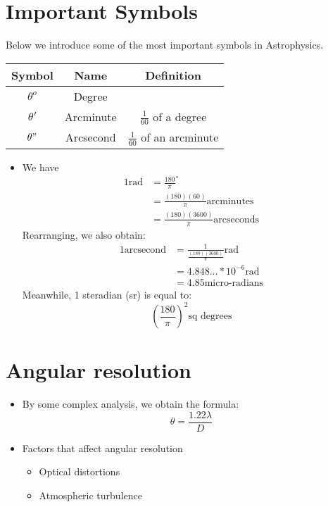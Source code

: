 \documentclass{article}
\begin{document}
\section{Important Symbols}
Below we introduce some of the most important symbols in Astrophysics.
\begin{table}[h]
  \begin{center}
    \begin{tabular}{c|c|c}
      \textbf{Symbol} & \textbf{Name}&\textbf{Definition}\\
      \hline
      $\theta^o$ & Degree &\\
      $\theta'$ & Arcminute & $\frac{1}{60}$ of a degree\\
      $\theta"$ & Arcsecond & $\frac{1}{60}$ of an arcminute
      \end{tabular}
  \end{center}
\end{table}
\begin{itemize}
\item We have 
\begin{align}
1\text{rad}&= {\frac{180}{\pi}}^{\circ}\\
&= {\frac{(180)(60)}{\pi}} \text{arcminutes}\\
&={\frac{(180)(3600)}{\pi}} \text{arcseconds}
\end{align}
Rearranging, we also obtain:
\begin{align}
1 \text{arcsecond}&=\frac{1}{\frac{(180)(3600)}{\pi}} \text{rad}\\
&=4.848...*10^{-6}\text{rad}\\
&=4.85  \text{micro-radians}
\end{align}
Meanwhile, 1 steradian (sr) is equal to:
\begin{equation}
\left(\frac{180}{\pi} \right)^2 \text{sq degrees}
\end{equation}
\end{itemize}
\section{Angular resolution}
\begin{itemize}
\item By some complex analysis, we obtain the formula:
\begin{equation}
\theta=\frac{1.22 \lambda}{D}
\end{equation}
\item Factors that affect angular resolution
\begin{itemize}
\item Optical distortions
\item Atmospheric turbulence
\end{itemize}
\end{itemize}
\end{document}
